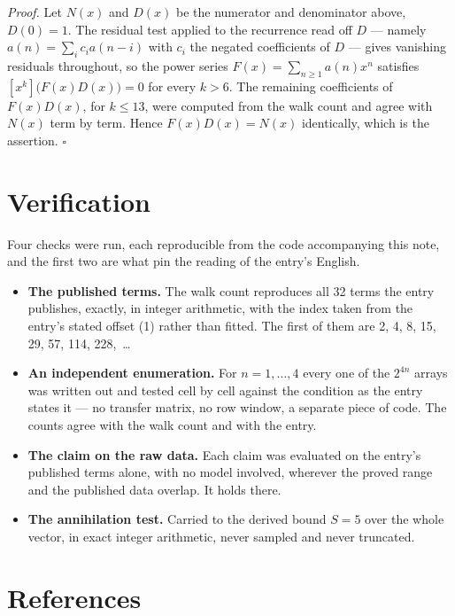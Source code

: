 \documentclass[11pt]{article}
\theoremstyle{definition}
\begin{document}
{\itshape Proof.} Let $N(x)$ and $D(x)$ be the numerator and denominator above, $D(0)=1$. The residual test applied to the recurrence read off $D$ --- namely $a(n) = \sum_i c_i a(n-i)$ with $c_i$ the negated coefficients of $D$ --- gives vanishing residuals throughout, so the power series $F(x)=\sum_{n\ge 1}a(n)x^n$ satisfies $[x^k]\bigl(F(x)D(x)\bigr) = 0$ for every $k > 6$. The remaining coefficients of $F(x)D(x)$, for $k \le 13$, were computed from the walk count and agree with $N(x)$ term by term. Hence $F(x)D(x) = N(x)$ identically, which is the assertion. $\square$

\section{Verification}

Four checks were run, each reproducible from the code accompanying this note, and the first two are what pin the reading of the entry's English.

\begin{itemize}

\item {\bfseries The published terms.} The walk count reproduces all 32 terms the entry publishes, exactly, in integer arithmetic, with the index taken from the entry's stated offset (1) rather than fitted. The first of them are 2, 4, 8, 15, 29, 57, 114, 228,~\dots

\item {\bfseries An independent enumeration.} For $n = 1,\dots,4$ every one of the $2^{4n}$ arrays was written out and tested cell by cell against the condition as the entry states it --- no transfer matrix, no row window, a separate piece of code. The counts agree with the walk count and with the entry.

\item {\bfseries The claim on the raw data.} Each claim was evaluated on the entry's published terms alone, with no model involved, wherever the proved range and the published data overlap. It holds there.

\item {\bfseries The annihilation test.} Carried to the derived bound $S = 5$ over the whole vector, in exact integer arithmetic, never sampled and never truncated.

\end{itemize}

\section{References}
\end{document}
